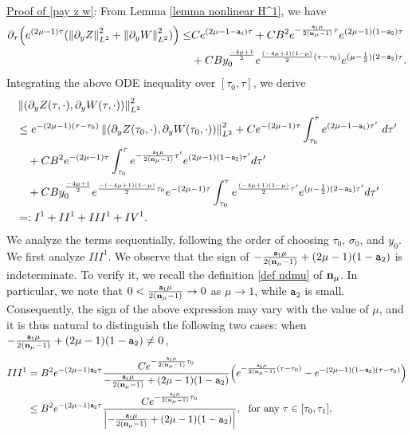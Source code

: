\documentclass{article}
\newcommand{\norm}[1]{\left\lVert#1\right\rVert}
\newcommand{\pa}{\partial}
\def\espz{Z}
\def\espw{W}
\def\epone{\mathtt{a_1}}
\def\eptwo{\mathtt{a_2}}
\def\ndmu{{\bf{n}_{\mu}}}
\numberwithin{equation}{section}
\begin{document}
   \noindent \underline{Proof of \eqref{pay z w}}: From Lemma \ref{lemma nonlinear H^1}, we have
    \begin{align*}
    \pa_\tau\Big(e^{(2\mu-1)\tau}(\norm{\pa_y\espz}_{L^2}^2+\norm{\pa_y\espw}_{L^2}^2)\Big)\leq &   C   e^{(2\mu-1-\epone) \tau} + CB^2 e^{-\frac{\epone \mu}{2(\ndmu-1)} \tau }e^{(2\mu-1)(1-\eptwo) \tau} \\
          &+CB y_0^{\frac{-4\mu +1}{2}} 
            e^{\frac{(-4\mu+1)(1-\mu)}{2}(\tau-\tau_0)}e^{(\mu-\frac12)(2-\eptwo)\tau}.
    \end{align*}
    Integrating the above ODE inequality over $[\tau_0, \tau]$, we derive
    \begin{align*}
        &\norm{(\pa_y\espz(\tau,\cdot), \pa_y \espw(\tau,\cdot))}_{L^2}^2 \\
        &\leq e^{-(2\mu-1)(\tau-\tau_0)} \norm{(\pa_y\espz(\tau_0,\cdot), \pa_y \espw(\tau_0,\cdot))}_{L^2}^2 
         + C  e^{-(2\mu-1)\tau}\int_{\tau_0}^{\tau} e^{(2\mu-1-\epone) \tau'} \ d\tau'\\
        &\quad + CB^2 e^{-(2\mu-1)\tau}\int_{\tau_0}^{\tau} e^{-\frac{\epone \mu}{2(\ndmu-1)} \tau' }e^{(2\mu-1)(1-\eptwo) \tau'} d\tau'\\
        &\quad + CB y_0^{\frac{-4\mu +1}{2}}e^{\frac{-(-4\mu+1)(1-\mu)}{2}\tau_0} e^{-(2\mu-1)\tau}\int_{\tau_0}^{\tau}
            e^{\frac{(-4\mu+1)(1-\mu)}{2}\tau'}e^{(\mu-\frac12)(2-\eptwo)\tau'}d\tau'\\
        &=: I^1+II^1+III^1+IV^1.
    \end{align*}
We analyze the terms sequentially, following the order of choosing $\tau_0$, $\sigma_0$, and $y_0$. We first analyze $III^1$. We observe that the sign of $-\frac{\epone \mu}{2(\ndmu-1)} +(2\mu-1)(1-\eptwo)$ is indeterminate. To verify it, we recall the definition \eqref{def ndmu} of $\ndmu$. In particular, we note that $0<\frac{\epone \mu}{2(\ndmu-1)} \to 0$ as $\mu\to 1$, while $\eptwo$ is small. Consequently, the sign of the above expression may vary with the value of $\mu$, and it is thus natural to distinguish the following two cases: when $-\frac{\epone \mu}{2(\ndmu-1)} +(2\mu-1)(1-\eptwo)\neq 0$,
\begin{align*}
    III^1 &= 
        B^2e^{-(2\mu-1)\eptwo \tau}\frac{ C e^{-\frac{\epone \mu}{2(\ndmu-1)}\tau_0 }}{-\frac{\epone \mu}{2(\ndmu-1)} +(2\mu-1)(1-\eptwo)}\Big(  e^{-\frac{\epone \mu}{2(\ndmu-1)}(\tau-\tau_0) }-e^{-(2\mu-1)(1-\eptwo)(\tau- \tau_0)}\Big)\\
        &\leq  B^2e^{-(2\mu-1)\eptwo \tau}\frac{ C e^{-\frac{\epone \mu}{2(\ndmu-1)}\tau_0 }}{\left|-\frac{\epone \mu}{2(\ndmu-1)} +(2\mu-1)(1-\eptwo)\right|},\ \text{ for any }\tau\in[\tau_0,\tau_1],
\end{align*}
\end{document}
